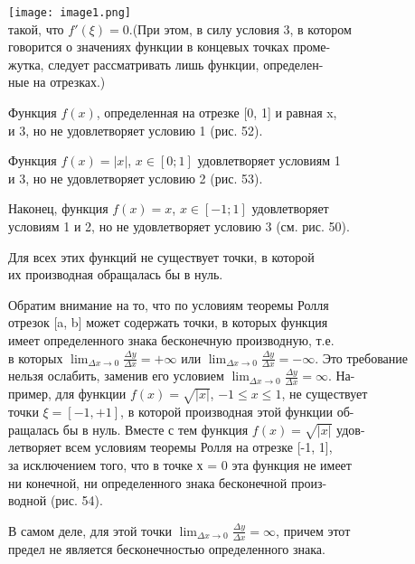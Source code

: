 \documentclass[12pt, a4paper]{article}
\begin{document}
\texttt{[image: image1.png]}\\	
такой, что $f'(\xi)=0$.(При этом, в силу условия 3, в котором\\
говорится о значениях функции в концевых точках проме-\\
жутка, следует рассматривать лишь функции, определен-\\
ные на отрезках.)
\par
Функция $f(x)$, определенная на отрезке [0, 1] и равная x,\\
и 3, но не удовлетворяет условию 1 (рис. 52).
\par
Функция $f(x)=|x|$, $x \in [0; 1]$ удовлетворяет условиям 1\\
и 3, но не удовлетворяет условию 2 (рис. 53).
\par
Наконец, функция $f(x)=x$, $x \in [-1; 1]$ удовлетворяет\\
условиям 1 и 2, но не удовлетворяет условию 3 (см. рис. 50).
\par
Для всех этих функций не существует точки, в которой\\
их производная обращалась бы в нуль.
\par
Обратим внимание на то, что по условиям теоремы Ролля\\
отрезок [a, b] может содержать точки, в которых функция\\
имеет определенного знака бесконечную производную, т.е.\\
в которых $\displaystyle{\lim_{\Delta x \to 0}} \frac{\Delta y}{\Delta x} = +\infty$ или $\displaystyle{\lim_{\Delta x \to 0}} \frac{\Delta y}{\Delta x} = -\infty$. Это требование\\
нельзя ослабить, заменив его условием $\displaystyle{\lim_{\Delta x \to 0}} \frac{\Delta y}{\Delta x} = \infty$. На-\\
пример, для функции $f(x) = \sqrt{|x|}$, $-1 \leq x \leq 1$, не существует\\
точки  $\xi = [-1, +1]$, в которой производная этой функции об-\\
ращалась бы в нуль. Вместе с тем функция $f(x) = \sqrt{|x|}$ удов-\\
летворяет всем условиям теоремы Ролля на отрезке [-1, 1],\\
за исключением того, что в точке х = 0 эта функция не имеет\\
ни конечной, ни определенного знака бесконечной произ-\\
водной (рис. 54).
\par
В самом деле, для этой точки $\displaystyle{\lim_{\Delta x \to 0}} \frac{\Delta y}{\Delta x} = \infty$, причем этот\\
предел не является бесконечностью определенного знака.
\setcounter{page}{317}
\end{document}
